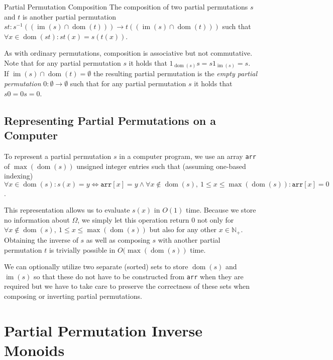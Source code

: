 \begin{defn}{Partial Permutation Composition}
  The composition of two partial permutations $s$ and $t$ is another partial
  permutation $st: s^{-1}((\operatorname{im}(s) \cap \operatorname{dom}(t)))
  \rightarrow t((\operatorname{im}(s) \cap \operatorname{dom}(t)))$ such that
  $\forall x \in \operatorname{dom}(st): st(x) = s(t(x))$.
\end{defn}
%
As with ordinary permutations, composition is associative but not
commutative. Note that for any partial permutation $s$ it holds that
$1_{\operatorname{dom}(s)} s = s 1_{\operatorname{im}(s)} = s$.  If
$\operatorname{im}(s) \cap \operatorname{dom}(t) = \emptyset$ the resulting
partial permutation is the \textit{empty partial permutation} $0: \emptyset
\rightarrow \emptyset$ such that for any partial permutation $s$ it holds that
$s 0 = 0 s = 0$.

\subsection{Representing Partial Permutations on a Computer}

To represent a partial permutation $s$ in a computer program, we use an array
\texttt{arr} of $\max(\operatorname{dom}(s))$ unsigned integer entries such
that (assuming one-based indexing) $\forall x \in \operatorname{dom}(s): s(x) =
y \Leftrightarrow \texttt{arr}[x] = y \land \forall x \notin
\operatorname{dom}(s),\ 1 \leq x \leq \max(\operatorname{dom}(s)):
\texttt{arr}[x] = 0$.

This representation allows us to evaluate $s(x)$ in $O(1)$ time. Because we
store no information about $\Omega$, we simply let this operation return $0$
not only for $\forall x \notin \operatorname{dom}(s),\ 1 \leq x \leq
\max(\operatorname{dom}(s))$ but also for any other $x \in \mathbb{N}_+$.
Obtaining the inverse of $s$ as well as composing $s$ with another partial
permutation $t$ is trivially possible in $O(\max(\operatorname{dom}(s))$ time.

We can optionally utilize two separate (sorted) sets to store
$\operatorname{dom}(s)$ and $\operatorname{im}(s)$ so that these do not have to
be constructed from \texttt{arr} when they are required but we have to take
care to preserve the correctness of these sets when composing or inverting
partial permutations.

\section{Partial Permutation Inverse Monoids}
\label{sec:theo_partial_permutation_inverse_monoids}

